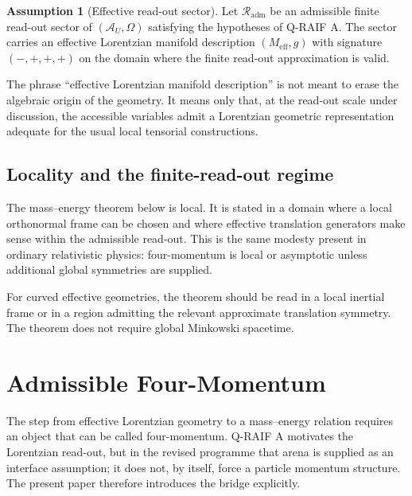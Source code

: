 \documentclass[12pt,a4paper]{article}
\theoremstyle{definition}
\newtheorem{assumption}[theorem]{Assumption}
\theoremstyle{remark}
\newcommand{\AU}{\mathcal{A}_U}
\newcommand{\Meff}{M_{\mathrm{eff}}}
\newcommand{\Omegastate}{\Omega}
\newcommand{\Rout}{\mathcal{R}_{\mathrm{adm}}}
\begin{document}
\begin{assumption}[Effective read-out sector]
\label{ass:sector}
Let $\Rout$ be an admissible finite read-out sector of $(\AU,\Omegastate)$ satisfying the hypotheses of Q-RAIF A. The sector carries an effective Lorentzian manifold description $(\Meff,g)$ with signature $(-,+,+,+)$ on the domain where the finite read-out approximation is valid.
\end{assumption}

The phrase ``effective Lorentzian manifold description'' is not meant to erase the algebraic origin of the geometry. It means only that, at the read-out scale under discussion, the accessible variables admit a Lorentzian geometric representation adequate for the usual local tensorial constructions.

\subsection{Locality and the finite-read-out regime}

The mass--energy theorem below is local. It is stated in a domain where a local orthonormal frame can be chosen and where effective translation generators make sense within the admissible read-out. This is the same modesty present in ordinary relativistic physics: four-momentum is local or asymptotic unless additional global symmetries are supplied.

For curved effective geometries, the theorem should be read in a local inertial frame or in a region admitting the relevant approximate translation symmetry. The theorem does not require global Minkowski spacetime.

\section{Admissible Four-Momentum}
\label{sec:momentum}

The step from effective Lorentzian geometry to a mass--energy relation requires an object that can be called four-momentum. Q-RAIF A motivates the Lorentzian read-out, but in the revised programme that arena is supplied as an interface assumption; it does not, by itself, force a particle momentum structure. The present paper therefore introduces the bridge explicitly.
\end{document}
